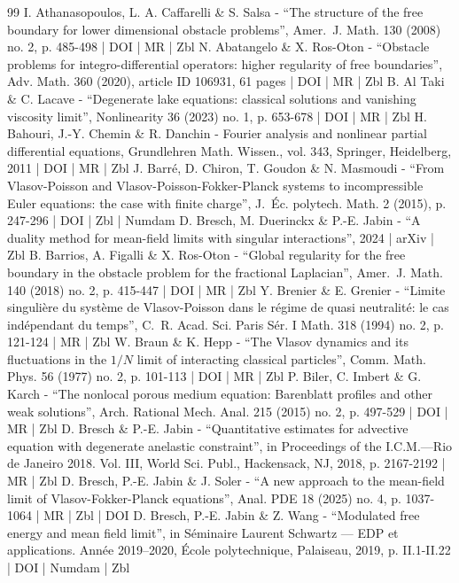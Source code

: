 \documentclass[10pt]{amsart}
\theoremstyle{plain}
\theoremstyle{definition}
\begin{document}
\begin{thebibliography}{99}
I. Athanasopoulos, L. A. Caffarelli \& S. Salsa - “The structure of the free boundary for lower dimensional obstacle problems”, Amer. J. Math. 130 (2008) no. 2, p. 485-498 | DOI | MR | Zbl
N. Abatangelo \& X. Ros-Oton - “Obstacle problems for integro-differential operators: higher regularity of free boundaries”, Adv. Math. 360 (2020), article ID 106931, 61 pages | DOI | MR | Zbl
B. Al Taki \& C. Lacave - “Degenerate lake equations: classical solutions and vanishing viscosity limit”, Nonlinearity 36 (2023) no. 1, p. 653-678 | DOI | MR | Zbl
H. Bahouri, J.-Y. Chemin \& R. Danchin - Fourier analysis and nonlinear partial differential equations, Grundlehren Math. Wissen., vol. 343, Springer, Heidelberg, 2011 | DOI | MR | Zbl
J. Barré, D. Chiron, T. Goudon \& N. Masmoudi - “From Vlasov-Poisson and Vlasov-Poisson-Fokker-Planck systems to incompressible Euler equations: the case with finite charge”, J. Éc. polytech. Math. 2 (2015), p. 247-296 | DOI | Zbl | Numdam
D. Bresch, M. Duerinckx \& P.-E. Jabin - “A duality method for mean-field limits with singular interactions”, 2024 | arXiv | Zbl
B. Barrios, A. Figalli \& X. Ros-Oton - “Global regularity for the free boundary in the obstacle problem for the fractional Laplacian”, Amer. J. Math. 140 (2018) no. 2, p. 415-447 | DOI | MR | Zbl
Y. Brenier \& E. Grenier - “Limite singulière du système de Vlasov-Poisson dans le régime de quasi neutralité: le cas indépendant du temps”, C. R. Acad. Sci. Paris Sér. I Math. 318 (1994) no. 2, p. 121-124 | MR | Zbl
W. Braun \& K. Hepp - “The Vlasov dynamics and its fluctuations in the $1/N$ limit of interacting classical particles”, Comm. Math. Phys. 56 (1977) no. 2, p. 101-113 | DOI | MR | Zbl
P. Biler, C. Imbert \& G. Karch - “The nonlocal porous medium equation: Barenblatt profiles and other weak solutions”, Arch. Rational Mech. Anal. 215 (2015) no. 2, p. 497-529 | DOI | MR | Zbl
D. Bresch \& P.-E. Jabin - “Quantitative estimates for advective equation with degenerate anelastic constraint”, in Proceedings of the I.C.M.—Rio de Janeiro 2018. Vol. III, World Sci. Publ., Hackensack, NJ, 2018, p. 2167-2192 | MR | Zbl
D. Bresch, P.-E. Jabin \& J. Soler - “A new approach to the mean-field limit of Vlasov-Fokker-Planck equations”, Anal. PDE 18 (2025) no. 4, p. 1037-1064 | MR | Zbl | DOI
D. Bresch, P.-E. Jabin \& Z. Wang - “Modulated free energy and mean field limit”, in Séminaire Laurent Schwartz — EDP et applications. Année 2019–2020, École polytechnique, Palaiseau, 2019, p. II.1-II.22 | DOI | Numdam | Zbl

\end{thebibliography}
\end{document}
